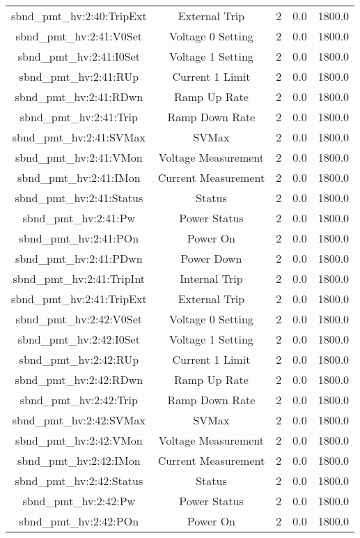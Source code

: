 \begin{table}[ptb]
\begin{tabular}{c | c c c c}
sbnd_pmt_hv:2:40:TripExt & External Trip & 2 & 0.0 & 1800.0\\ 
sbnd_pmt_hv:2:41:V0Set & Voltage 0 Setting & 2 & 0.0 & 1800.0\\ 
sbnd_pmt_hv:2:41:I0Set & Voltage 1 Setting & 2 & 0.0 & 1800.0\\ 
sbnd_pmt_hv:2:41:RUp & Current 1 Limit & 2 & 0.0 & 1800.0\\ 
sbnd_pmt_hv:2:41:RDwn & Ramp Up Rate & 2 & 0.0 & 1800.0\\ 
sbnd_pmt_hv:2:41:Trip & Ramp Down Rate & 2 & 0.0 & 1800.0\\ 
sbnd_pmt_hv:2:41:SVMax & SVMax & 2 & 0.0 & 1800.0\\ 
sbnd_pmt_hv:2:41:VMon & Voltage Measurement & 2 & 0.0 & 1800.0\\ 
sbnd_pmt_hv:2:41:IMon & Current Measurement & 2 & 0.0 & 1800.0\\ 
sbnd_pmt_hv:2:41:Status & Status & 2 & 0.0 & 1800.0\\ 
sbnd_pmt_hv:2:41:Pw & Power Status & 2 & 0.0 & 1800.0\\ 
sbnd_pmt_hv:2:41:POn & Power On & 2 & 0.0 & 1800.0\\ 
sbnd_pmt_hv:2:41:PDwn & Power Down & 2 & 0.0 & 1800.0\\ 
sbnd_pmt_hv:2:41:TripInt & Internal Trip & 2 & 0.0 & 1800.0\\ 
sbnd_pmt_hv:2:41:TripExt & External Trip & 2 & 0.0 & 1800.0\\ 
sbnd_pmt_hv:2:42:V0Set & Voltage 0 Setting & 2 & 0.0 & 1800.0\\ 
sbnd_pmt_hv:2:42:I0Set & Voltage 1 Setting & 2 & 0.0 & 1800.0\\ 
sbnd_pmt_hv:2:42:RUp & Current 1 Limit & 2 & 0.0 & 1800.0\\ 
sbnd_pmt_hv:2:42:RDwn & Ramp Up Rate & 2 & 0.0 & 1800.0\\ 
sbnd_pmt_hv:2:42:Trip & Ramp Down Rate & 2 & 0.0 & 1800.0\\ 
sbnd_pmt_hv:2:42:SVMax & SVMax & 2 & 0.0 & 1800.0\\ 
sbnd_pmt_hv:2:42:VMon & Voltage Measurement & 2 & 0.0 & 1800.0\\ 
sbnd_pmt_hv:2:42:IMon & Current Measurement & 2 & 0.0 & 1800.0\\ 
sbnd_pmt_hv:2:42:Status & Status & 2 & 0.0 & 1800.0\\ 
sbnd_pmt_hv:2:42:Pw & Power Status & 2 & 0.0 & 1800.0\\ 
sbnd_pmt_hv:2:42:POn & Power On & 2 & 0.0 & 1800.0\\ 

\end{tabular}
\end{table}
